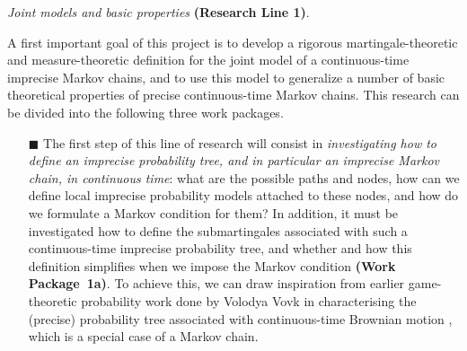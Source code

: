 \documentclass[11pt,dvipsnames,usenames,a4paper]{article}
\begin{document}
\vspace{5pt}
\emph{Joint models and basic properties} {\bf (Research Line 1)}.
\vspace{3pt}

A first important goal of this project is to develop a rigorous martingale-theoretic and measure-theoretic definition for the joint model of a continuous-time imprecise Markov chains, and to use this model to generalize a number of basic theoretical properties of precise continuous-time Markov chains. %
This research can be divided into the following three work packages.

\vspace{6pt}
\begin{itemize}
\item[\tiny$\blacksquare$]
The first step of this line of research will consist in \emph{investigating how to define an imprecise probability tree, and in particular an imprecise Markov chain, in continuous time}: what are the possible paths and nodes, how can we define local imprecise probability models attached to these nodes, and how do we formulate a Markov condition for them?
In addition, it must be investigated how to define the submartingales associated with such a continuous-time imprecise probability tree, and whether and how this definition simplifies when we impose the Markov condition {\bf(Work Package~1a)}.
To achieve this, we can draw inspiration from earlier game-theoretic probability work done by Volodya Vovk in characterising the (precise) probability tree associated with continuous-time Brownian motion \cite{vovk2008:brownian,vovk2012:emergence:of:probability}, which is a special case of a Markov chain.%


\end{itemize}
\end{document}
